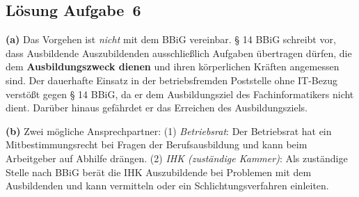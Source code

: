 \documentclass[11pt, a4paper]{article}
\begin{document}
\subsection*{Lösung Aufgabe~6}
\begin{loesung}
\textbf{(a)} Das Vorgehen ist \emph{nicht} mit dem BBiG vereinbar. § 14 BBiG schreibt vor,
dass Ausbildende Auszubildenden ausschließlich Aufgaben übertragen dürfen, die dem
\textbf{Ausbildungszweck dienen} und ihren körperlichen Kräften angemessen sind. Der
dauerhafte Einsatz in der betriebsfremden Poststelle ohne IT-Bezug verstößt gegen § 14 BBiG,
da er dem Ausbildungsziel des Fachinformatikers nicht dient. Darüber hinaus gefährdet er
das Erreichen des Ausbildungsziels.

\textbf{(b)} Zwei mögliche Ansprechpartner:
(1) \emph{Betriebsrat}: Der Betriebsrat hat ein Mitbestimmungsrecht bei Fragen der
Berufsausbildung und kann beim Arbeitgeber auf Abhilfe drängen.
(2) \emph{IHK (zuständige Kammer)}: Als zuständige Stelle nach BBiG berät die IHK
Auszubildende bei Problemen mit dem Ausbildenden und kann vermitteln oder ein
Schlichtungsverfahren einleiten.
\end{loesung}
\end{document}
